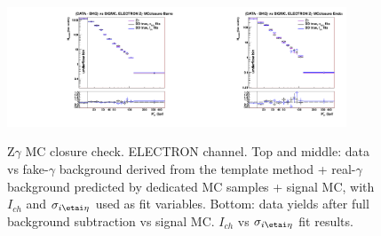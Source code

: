\begin{figure}[htb]
\begin{center}
\includegraphics[width=0.45\textwidth]{../figs/figs_v11/ELECTRON_ZGamma/PrepareYields/c_BkgSubtrDATAvsSIGMC_c_ELECTRON_ZGamma__UNblind_MCclosure__Barrel__phoEt_MCclosure.pdf}\includegraphics[width=0.45\textwidth]{../figs/figs_v11/ELECTRON_ZGamma/PrepareYields/c_BkgSubtrDATAvsSIGMC_c_ELECTRON_ZGamma__UNblind_MCclosure__Endcap__phoEt_MCclosure.pdf}\\
  \caption{Z$\gamma$ MC closure check. ELECTRON channel. Top and middle: data vs fake-$\gamma$ background derived from the template method + real-$\gamma$ background predicted by dedicated MC samples + signal MC, with $I_{ch}$ and $\sigma_{i\etai\eta}$ used as fit variables. Bottom: data yields after full background subtraction vs signal MC. $I_{ch}$ vs $\sigma_{i\etai\eta}$ fit results. }
  \label{fig:DDvsMC_Zg_MCclosure_ELECTRON}
  \end{center}
\end{figure}

\clearpage


